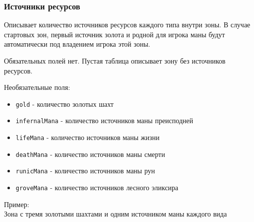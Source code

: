 \subsubsection{Источники ресурсов}
\label{crystals}
Описывает количество источников ресурсов каждого типа внутри зоны. В случае стартовых зон, первый источник золота и родной для игрока маны будут автоматически под владением игрока этой зоны.

Обязательных полей нет. Пустая таблица описывает зону без источников ресурсов.

Необязательные поля:
\begin{itemize}
\item \texttt{gold} - количество золотых шахт 
\item \texttt{infernalMana} - количество источников маны преисподней
\item \texttt{lifeMana} - количество источников маны жизни
\item \texttt{deathMana} - количество источников маны смерти
\item \texttt{runicMana} - количество источников маны рун
\item \texttt{groveMana} - количество источников лесного эликсира
\end{itemize}

Пример:\\
Зона с тремя золотыми шахтами и одним источником маны каждого вида

\begin{figure}[H]

\end{figure}